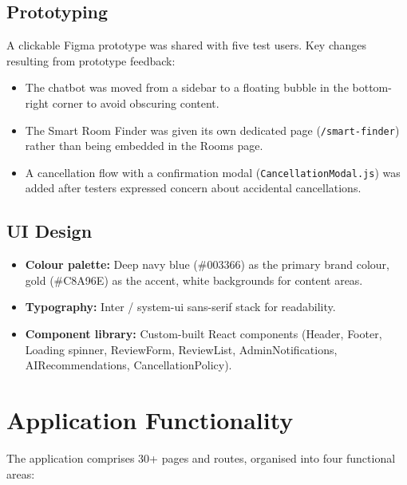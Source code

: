 \documentclass[12pt,a4paper]{report}
\begin{document}
\subsection*{Prototyping}
A clickable Figma prototype was shared with five test users. Key changes resulting from prototype feedback:
\begin{itemize}[leftmargin=*, label=\textbullet]
  \item The chatbot was moved from a sidebar to a floating bubble in the bottom-right corner to avoid obscuring content.
  \item The Smart Room Finder was given its own dedicated page (\texttt{/smart-finder}) rather than being embedded in the Rooms page.
  \item A cancellation flow with a confirmation modal (\texttt{CancellationModal.js}) was added after testers expressed concern about accidental cancellations.
\end{itemize}

\subsection*{UI Design}
\begin{itemize}[leftmargin=*, label=\textbullet]
  \item \textbf{Colour palette:} Deep navy blue (\#003366) as the primary brand colour, gold (\#C8A96E) as the accent, white backgrounds for content areas.
  \item \textbf{Typography:} Inter / system-ui sans-serif stack for readability.
  \item \textbf{Component library:} Custom-built React components (Header, Footer, Loading spinner, ReviewForm, ReviewList, AdminNotifications, AIRecommendations, CancellationPolicy).
\end{itemize}

\section{Application Functionality}

The application comprises 30+ pages and routes, organised into four functional areas:
\end{document}
